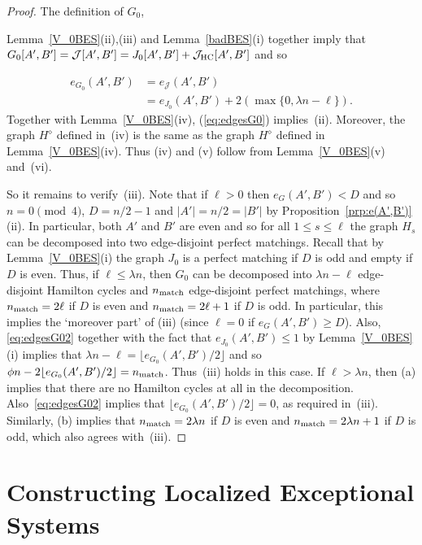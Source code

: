 \documentclass{memo-l}
\def\COMMENT#1{}
\numberwithin{section}{chapter}
\numberwithin{equation}{section}
\numberwithin{firstthm}{section}
\numberwithin{figure}{section}
\begin{document}
\begin{proof}
The definition of $G_0$,%
   \COMMENT{Daniela: had $G'$ instead of $G_0$}
Lemma~\ref{V_0BES}(ii),(iii) and Lemma~\ref{badBES}(i) together imply that
$G_0[A',B']=\mathcal{J}[A',B']=J_0[A',B']+\mathcal{J}_{\rm HC}[A',B']$ and so%
\COMMENT{Deryk: I split this display to make clearer what we use when}
\begin{align}
e_{G_0}(A',B') & =e_{\mathcal{J}}(A',B') \label{eq:edgesG0} \\
& =e_{J_0}(A',B')+2(\max\{0,\lambda n-\ell\}). \label{eq:edgesG02}
\end{align}
Together with Lemma~\ref{V_0BES}(iv), (\ref{eq:edgesG0}) implies~(ii).
Moreover, the graph $H^{\diamond}$ defined in~(iv) is the same as the graph $H^{\diamond}$ defined
in Lemma~\ref{V_0BES}(iv). Thus (iv) and (v) follow from Lemma~\ref{V_0BES}(v) and~(vi).

So it remains to verify~(iii).
Note that if $\ell>0$ then $e_G(A',B') < D$
and so $n = 0 \pmod4$, $D = n/2-1$ and $|A'| = n/2 = |B'|$ by Proposition~\ref{prp:e(A',B')}(ii). In particular,
both $A'$ and $B'$ are even and so for all $1\le s\le \ell$ the graph $H_s$ can be decomposed into two edge-disjoint
perfect matchings. Recall that by Lemma~\ref{V_0BES}(i) the graph $J_0$ is a perfect matching if $D$ is odd
and empty if $D$ is even. 
Thus, if $ \ell \le \lambda n$, then $G_0$ can be decomposed into $\lambda n-\ell$ edge-disjoint Hamilton cycles and $n_{\rm match}$ edge-disjoint
perfect matchings, where $n_{\rm match}=2\ell$ if $D$ is even and $n_{\rm match}=2\ell+1$ if $D$ is odd.
In particular, this implies the `moreover part' of (iii) (since $\ell=0$ if $e_G(A',B')\ge D$).
Also, \eqref{eq:edgesG02} together with the fact that $e_{J_0}(A',B')\le 1$ by Lemma~\ref{V_0BES}(i) implies that
$\lambda n-\ell = \lfloor e_{G_0}(A',B')/2 \rfloor$ and so
$\phi n - 2\lfloor e_{G_0}(A',B')/2 \rfloor=n_{\rm match}$. Thus~(iii) holds in this case.
If $ \ell > \lambda n$, then (a) implies that there are no Hamilton cycles at all in the decomposition.
Also~\eqref{eq:edgesG02} implies that $\lfloor e_{G_0}(A',B')/2 \rfloor =0$, as required in~(iii).
Similarly, (b) implies that $n_{\rm match}=2 \lambda n$ if $D$ is even and $n_{\rm match}=2 \lambda n+1$ if $D$ is odd, which also agrees with~(iii).
\end{proof}


\section{Constructing Localized Exceptional Systems}\label{sec:locES}
\end{document}
